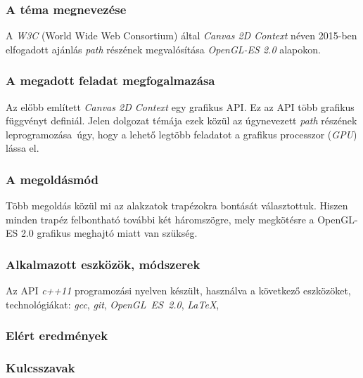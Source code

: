 \documentclass[12pt]{report}
\theoremstyle{definition}
\begin{document}

    \subsubsection*{A téma megnevezése}

  A \emph{W3C} (World Wide Web Consortium) által \emph{Canvas 2D Context} néven
2015-ben elfogadott ajánlás \emph{path} részének megvalósítása \emph{OpenGL-ES
2.0} alapokon.

    \subsubsection*{A megadott feladat megfogalmazása}

  Az előbb említett \emph{Canvas 2D Context} egy grafikus API. Ez az API több
grafikus függvényt definiál. Jelen dolgozat témája ezek közül az úgynevezett
\emph{path} részének leprogramozása~úgy, hogy a lehető legtöbb feladatot a
grafikus processzor (\textit{GPU}) lássa el.

    \subsubsection*{A megoldásmód}

  Több megoldás közül mi az alakzatok trapézokra bontását választottuk. Hiszen
minden trapéz felbontható további két háromszögre, mely megkötésre a OpenGL-ES 2.0
grafikus meghajtó  miatt van szükség.

    \subsubsection*{Alkalmazott eszközök, módszerek}

  Az API \emph{c++11} programozási nyelven készült, használva a következő
eszközöket, technológiákat: \emph{gcc}, \emph{git}, \textit{OpenGL~ES~2.0}, \emph{\LaTeX},

    \subsubsection*{Elért eredmények}

    \subsubsection*{Kulcsszavak}
\end{document}
